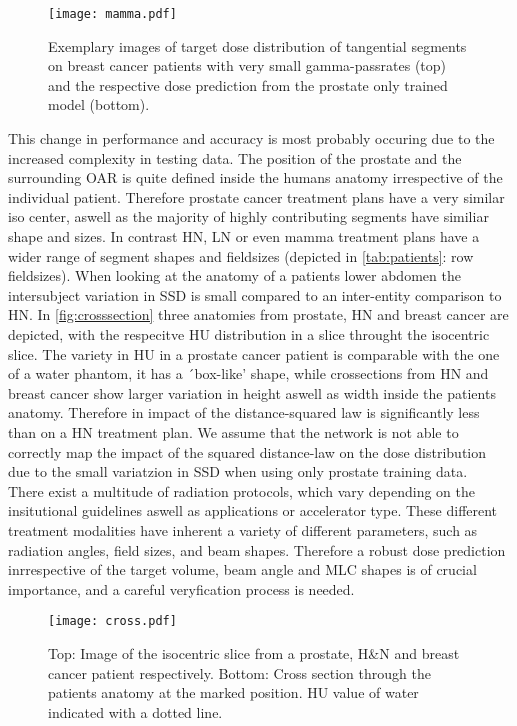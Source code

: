 \begin{figure}
    \centering
    \texttt{[image: mamma.pdf]}
    \caption{
        Exemplary images of target dose distribution of tangential segments on breast cancer patients with very small gamma-passrates (top) and the respective dose prediction from the prostate only trained model (bottom).}\label{fig:mamma}
\end{figure}

This change in performance and accuracy is most probably occuring due to the increased complexity in testing data. 
The position of the prostate and the surrounding \acs{OAR} is quite defined inside the humans anatomy irrespective of the individual patient. 
Therefore prostate cancer treatment plans have a very similar iso center, aswell as the majority of highly contributing segments have similiar shape and sizes.
In contrast \ac{HN}, \ac{LN} or even mamma treatment plans have a wider range of segment shapes and fieldsizes (depicted in \autoref{tab:patients}: row fieldsizes). 
When looking at the anatomy of a patients lower abdomen the intersubject variation in \acs{SSD} is small compared to an inter-entity comparison to \acs{HN}. 
In \autoref{fig:crosssection} three anatomies from prostate, \acs{HN} and breast cancer are depicted, with the respecitve \ac{HU} distribution in a slice throught the isocentric slice.
The variety in \acs{HU} in a prostate cancer patient is comparable with the one of a water phantom, it has a ´box-like' shape, while crossections from \acs{HN} and breast cancer show larger variation in height aswell as width inside the patients anatomy. 
Therefore in impact of the distance-squared law is significantly less than on a \acs{HN} treatment plan.
We assume that the network is not able to correctly map the impact of the squared distance-law on the dose distribution due to the small variatzion in \acs{SSD} when using only prostate training data.\\
There exist a multitude of radiation protocols, which vary depending on the insitutional guidelines aswell as applications or accelerator type. 
These different treatment modalities have inherent a variety of different parameters, such as radiation angles, field sizes, and beam shapes.
Therefore a robust dose prediction inrrespective of the target volume, beam angle and \acs{MLC} shapes is of crucial importance, and a careful veryfication process is needed. 

\begin{figure}
    \centering
    \texttt{[image: cross.pdf]}
    \caption{
        Top: Image of the isocentric slice from a prostate, H\&N and breast cancer patient respectively. 
        Bottom: Cross section through the patients anatomy at the marked position.
        HU value of water indicated with a dotted line.}\label{fig:crosssection}
\end{figure}

